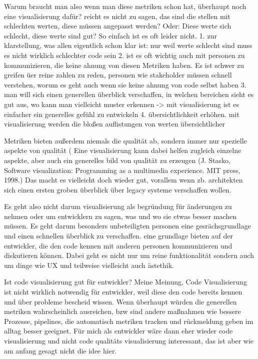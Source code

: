 Warum braucht man also wenn man diese metriken schon hat, überhaupt noch eine visualisierung dafür?
reicht es nicht zu sagen, das sind die stellen mit schlechten werten, diese müssen angepasst werden? Oder: Diese werte sich schlecht, diese werte sind gut?
So einfach ist es oft leider nicht. 
1. zur klarstellung, was allen eigentlich schon klar ist: nur weil werte schlecht sind muss es nicht wirklich schlechter code sein
2. ist es oft wichtig auch mit personen zu kommunizieren, die keine ahnung von diesen Metriken haben. Es ist schwer zu greifen üer reine zahlen zu reden, personen wie stakeholder müssen schnell verstehen, worum es geht auch wenn sie keine ahnung von code selbst haben
3. man will sich einen generellen überblick verschaffen, in welchen bereichen sieht es gut aus, wo kann man vielleicht muster erkennen -> mit visualisierung ist es einfacher ein generelles gefühl zu entwickeln
4. übersichtlichkeit erhöhen. mit visualisierung werden die bloßen auflistungen von werten übersichtlicher


Metriken bieten außerdem niemals die qualität ab, sondern immer nur spezielle aspekte von qualität (%
Eine visualisierung kann dabei helfen zugleich einzelne aspekte, aber auch ein generelles bild von qualität zu erzeugen (J. Stasko, Software visualization: Programming as a multimedia experience. MIT press, 1998.)
Das macht es vielleicht doch wieder gut, vorallem wenn zb. architekten sich einen ersten groben überblick über legacy systeme verschaffen wollen.

Es geht also nicht darum visualisierung als begründung für änderungen zu nehmen oder um entwicklern zu sagen, was und wo sie etwas besser machen müssen.
Es geht darum besonders unbeteiligten personen eine gesrächsgrundlage und einen schnellen überblick zu verschaffen. eine grundlage bieten auf der entwickler, die den code kennen mit anderen personen kommunizieren und diskutieren können. Dabei geht es nicht nur um reine funktionalität sondern auch um dinge wie UX und teilweise vielleicht auch ästethik.


Ist code visualisierung gut für entwickler?
Meine Meinung, Code Visualisierung ist nicht wirklich notwendig für entwickler, weil diese den code bereits kennen und über probleme bescheid wissen. Wenn überhaupt würden die generellen metriken wahrscheinlich ausreichen, bzw sind andere maßnahmen wie bessere Prozesse, pipelines, die automatisch metriken tracken und rückmeldung geben im alltag besser geeignet.
Für mich als entwickler wäre dann eher wieder code visualisierung und nicht code qualitäts visualisierung interessant, das ist aber wie am anfang gesagt nicht die idee hier.

